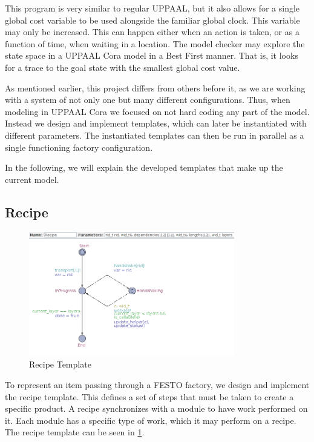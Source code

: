 This program is very similar to regular UPPAAL, but it also allows for a single global cost variable to be used alongside the familiar global clock. This variable may only be increased. This can happen either when an action is taken, or as a function of time, when waiting in a location. The model checker may explore the state space in a UPPAAL Cora model in a Best First manner. That is, it looks for a trace to the goal state with the smallest global cost value.  

As mentioned earlier, this project differs from others before it, as we are working with a system of not only one but many different configurations. Thus, when modeling in UPPAAL Cora we focused on not hard coding any part of the model. Instead we design and implement templates, which can later be instantiated with different parameters. The instantiated templates can then be run in parallel as a single functioning factory configuration. 

In the following, we will explain the developed templates that make up the current model.


\subsection{Recipe}

\begin{figure}
\centering
\includegraphics[width=0.8\textwidth]{images/firstrecipe.png}
\caption{Recipe Template}
\label{fig:firstrecipe}
\end{figure}

To represent an item passing through a FESTO factory, we design and implement the recipe template. This defines a set of steps that must be taken to create a specific product. A recipe synchronizes with a module to have work performed on it. Each module has a specific type of work, which it may perform on a recipe.  The recipe template can be seen in \cref{fig:firstrecipe}.

